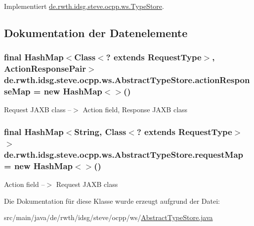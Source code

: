 Implementiert \hyperlink{interfacede_1_1rwth_1_1idsg_1_1steve_1_1ocpp_1_1ws_1_1_type_store_a54a18429b276fc578be2c8458d95ac16}{de.\+rwth.\+idsg.\+steve.\+ocpp.\+ws.\+Type\+Store}.



\subsection{Dokumentation der Datenelemente}
\hypertarget{classde_1_1rwth_1_1idsg_1_1steve_1_1ocpp_1_1ws_1_1_abstract_type_store_ac58fed0b3c17c657e6dea4e1310c667f}{
\subsubsection[{action\+Response\+Map}]{\setlength{\rightskip}{0pt plus 5cm}final Hash\+Map$<$Class$<$? extends {\bf Request\+Type}$>$, {\bf Action\+Response\+Pair}$>$ de.\+rwth.\+idsg.\+steve.\+ocpp.\+ws.\+Abstract\+Type\+Store.\+action\+Response\+Map = new Hash\+Map$<$$>$()\hspace{0.3cm}{\ttfamily [protected]}}}\label{classde_1_1rwth_1_1idsg_1_1steve_1_1ocpp_1_1ws_1_1_abstract_type_store_ac58fed0b3c17c657e6dea4e1310c667f}
Request J\+A\+X\+B class --$>$ Action field, Response J\+A\+X\+B class \hypertarget{classde_1_1rwth_1_1idsg_1_1steve_1_1ocpp_1_1ws_1_1_abstract_type_store_a591ed9920192486ad695bbad5463cdc8}{
\subsubsection[{request\+Map}]{\setlength{\rightskip}{0pt plus 5cm}final Hash\+Map$<$String, Class$<$? extends {\bf Request\+Type}$>$ $>$ de.\+rwth.\+idsg.\+steve.\+ocpp.\+ws.\+Abstract\+Type\+Store.\+request\+Map = new Hash\+Map$<$$>$()\hspace{0.3cm}{\ttfamily [protected]}}}\label{classde_1_1rwth_1_1idsg_1_1steve_1_1ocpp_1_1ws_1_1_abstract_type_store_a591ed9920192486ad695bbad5463cdc8}
Action field --$>$ Request J\+A\+X\+B class 

Die Dokumentation für diese Klasse wurde erzeugt aufgrund der Datei\+:\begin{DoxyCompactItemize}
\item 
src/main/java/de/rwth/idsg/steve/ocpp/ws/\hyperlink{_abstract_type_store_8java}{Abstract\+Type\+Store.\+java}\end{DoxyCompactItemize}
